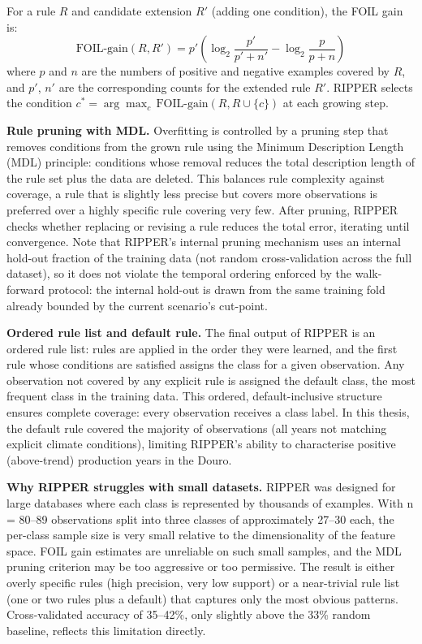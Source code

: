 For a rule $R$ and candidate extension $R'$ (adding one condition), the FOIL gain is:
\begin{equation}
  \text{FOIL-gain}(R, R') = p' \left(\log_2\frac{p'}{p'+n'} - \log_2\frac{p}{p+n}\right)
  \label{eq:foil}
\end{equation}
where $p$ and $n$ are the numbers of positive and negative examples covered by $R$, and $p'$, $n'$ are the corresponding counts for the extended rule $R'$. RIPPER selects the condition $c^* = \arg\max_c \,\text{FOIL-gain}(R, R \cup \{c\})$ at each growing step.

\textbf{Rule pruning with MDL. }Overfitting is controlled by a pruning step that removes conditions from the grown rule using the Minimum Description Length (MDL) principle: conditions whose removal reduces the total description length of the rule set plus the data are deleted. This balances rule complexity against coverage, a rule that is slightly less precise but covers more observations is preferred over a highly specific rule covering very few. After pruning, RIPPER checks whether replacing or revising a rule reduces the total error, iterating until convergence. Note that RIPPER's internal pruning mechanism uses an internal hold-out fraction of the training data (not random cross-validation across the full dataset), so it does not violate the temporal ordering enforced by the walk-forward protocol: the internal hold-out is drawn from the same training fold already bounded by the current scenario's cut-point.

\textbf{Ordered rule list and default rule. }The final output of RIPPER is an ordered rule list: rules are applied in the order they were learned, and the first rule whose conditions are satisfied assigns the class for a given observation. Any observation not covered by any explicit rule is assigned the default class, the most frequent class in the training data. This ordered, default-inclusive structure ensures complete coverage: every observation receives a class label. In this thesis, the default rule covered the majority of observations (all years not matching explicit climate conditions), limiting RIPPER's ability to characterise positive (above-trend) production years in the Douro.

\textbf{Why RIPPER struggles with small datasets. }RIPPER was designed for large databases where each class is represented by thousands of examples. With n = 80--89 observations split into three classes of approximately 27--30 each, the per-class sample size is very small relative to the dimensionality of the feature space. FOIL gain estimates are unreliable on such small samples, and the MDL pruning criterion may be too aggressive or too permissive. The result is either overly specific rules (high precision, very low support) or a near-trivial rule list (one or two rules plus a default) that captures only the most obvious patterns. Cross-validated accuracy of 35--42\%, only slightly above the 33\% random baseline, reflects this limitation directly.


